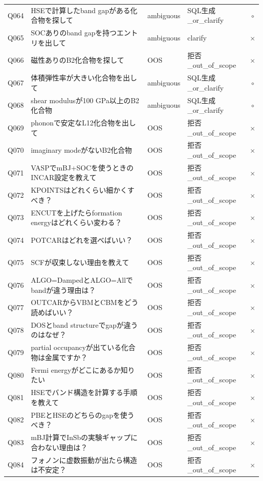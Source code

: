 \documentclass[3p]{elsarticle}
\begin{document}
\begin{longtable}{lp{5cm}llc}
  Q064 & HSEで計算したband gapがある化合物を探して & ambiguous & SQL生成\_or\_clarify & $\circ$ \\
  Q065 & SOCありのband gapを持つエントリを出して & ambiguous & clarify & $\times$ \\
  Q066 & 磁性ありのB2化合物を探して & OOS & 拒否\_out\_of\_scope & $\times$ \\
  Q067 & 体積弾性率が大きい化合物を出して & ambiguous & SQL生成\_or\_clarify & $\circ$ \\
  Q068 & shear modulusが100 GPa以上のB2化合物 & ambiguous & SQL生成\_or\_clarify & $\circ$ \\
  Q069 & phononで安定なL12化合物を出して & OOS & 拒否\_out\_of\_scope & $\times$ \\
  Q070 & imaginary modeがないB2化合物 & OOS & 拒否\_out\_of\_scope & $\times$ \\
  Q071 & VASPでmBJ+SOCを使うときのINCAR設定を教えて & OOS & 拒否\_out\_of\_scope & $\times$ \\
  Q072 & KPOINTSはどれくらい細かくすべき？ & OOS & 拒否\_out\_of\_scope & $\times$ \\
  Q073 & ENCUTを上げたらformation energyはどれくらい変わる？ & OOS & 拒否\_out\_of\_scope & $\times$ \\
  Q074 & POTCARはどれを選べばいい？ & OOS & 拒否\_out\_of\_scope & $\times$ \\
  Q075 & SCFが収束しない理由を教えて & OOS & 拒否\_out\_of\_scope & $\times$ \\
  Q076 & ALGO=DampedとALGO=Allでbandが違う理由は？ & OOS & 拒否\_out\_of\_scope & $\times$ \\
  Q077 & OUTCARからVBMとCBMをどう読めばいい？ & OOS & 拒否\_out\_of\_scope & $\times$ \\
  Q078 & DOSとband structureでgapが違うのはなぜ？ & OOS & 拒否\_out\_of\_scope & $\times$ \\
  Q079 & partial occupancyが出ている化合物は金属ですか？ & OOS & 拒否\_out\_of\_scope & $\times$ \\
  Q080 & Fermi energyがどこにあるか知りたい & OOS & 拒否\_out\_of\_scope & $\times$ \\
  Q081 & HSEでバンド構造を計算する手順を教えて & OOS & 拒否\_out\_of\_scope & $\times$ \\
  Q082 & PBEとHSEのどちらのgapを使うべき？ & OOS & 拒否\_out\_of\_scope & $\times$ \\
  Q083 & mBJ計算でInSbの実験ギャップに合わない理由は？ & OOS & 拒否\_out\_of\_scope & $\times$ \\
  Q084 & フォノンに虚数振動が出たら構造は不安定？ & OOS & 拒否\_out\_of\_scope & $\times$ \\

\end{longtable}
\end{document}
